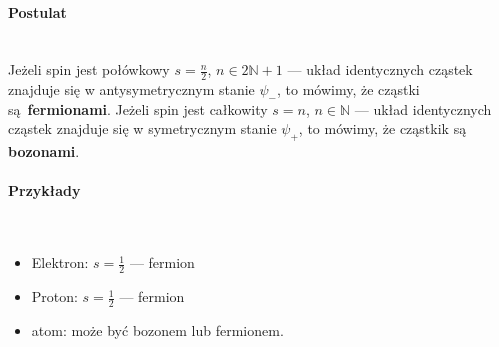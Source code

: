 \paragraph*{Postulat}\mbox{}\\
%
Jeżeli spin jest połówkowy $s = \frac{n}{2}$, $n \in 2\mathbb{N} + 1$
--- układ identycznych cząstek znajduje się w antysymetrycznym stanie $\psi_-$,
to mówimy, że cząstki są \textbf{fermionami}.
Jeżeli spin jest całkowity $s = n$, $n \in \mathbb{N}$
--- układ identycznych cząstek znajduje się w symetrycznym stanie
$\psi_+$, to mówimy, że cząstkik są \textbf{bozonami}.
%
\paragraph*{Przykłady}\mbox{}\\
\begin{itemize}
    \item Elektron: $s = \frac{1}{2}$ --- fermion
    \item Proton: $s = \frac{1}{2}$ --- fermion
    \item atom: może być bozonem lub fermionem.
\end{itemize}
%
